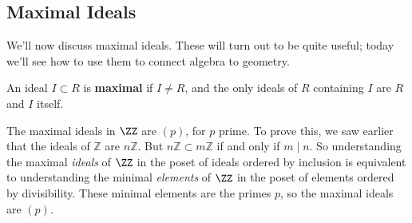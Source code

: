 



\subsection{Maximal Ideals}

We'll now discuss maximal ideals. These will turn out to be quite useful; today we'll see how to use them to connect algebra to geometry. 



\begin{definition}
An ideal $I \subset R$ is \textbf{maximal} if $I \neq R$, and the only ideals of $R$ containing $I$ are $R$ and $I$ itself. 
\end{definition}

\begin{example}
    The maximal ideals in $\ZZ$ are $(p)$, for $p$ prime. To prove this, we saw earlier that the ideals of $\mathbb{Z}$ are $n\mathbb{Z}$. But $n\mathbb{Z} \subset m\mathbb{Z}$ if and only if $m \mid n$. So understanding the maximal \emph{ideals} of $\ZZ$ in the poset of ideals ordered by inclusion is equivalent to understanding the minimal \emph{elements} of $\ZZ$ in the poset of elements ordered by divisibility. These minimal elements are the primes $p$, so the maximal ideals are $(p)$. 
\end{example}

